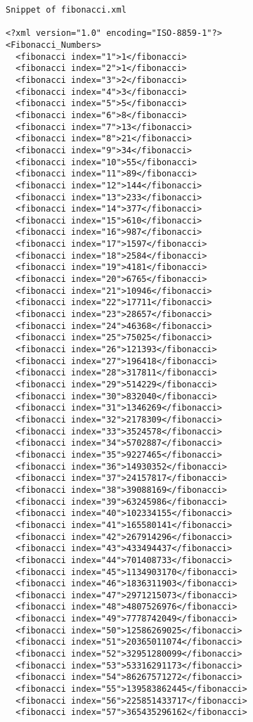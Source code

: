 \documentclass[11pt,english]{article}
\begin{document}
\begin{lstlisting}
Snippet of fibonacci.xml

<?xml version="1.0" encoding="ISO-8859-1"?>
<Fibonacci_Numbers>
  <fibonacci index="1">1</fibonacci>
  <fibonacci index="2">1</fibonacci>
  <fibonacci index="3">2</fibonacci>
  <fibonacci index="4">3</fibonacci>
  <fibonacci index="5">5</fibonacci>
  <fibonacci index="6">8</fibonacci>
  <fibonacci index="7">13</fibonacci>
  <fibonacci index="8">21</fibonacci>
  <fibonacci index="9">34</fibonacci>
  <fibonacci index="10">55</fibonacci>
  <fibonacci index="11">89</fibonacci>
  <fibonacci index="12">144</fibonacci>
  <fibonacci index="13">233</fibonacci>
  <fibonacci index="14">377</fibonacci>
  <fibonacci index="15">610</fibonacci>
  <fibonacci index="16">987</fibonacci>
  <fibonacci index="17">1597</fibonacci>
  <fibonacci index="18">2584</fibonacci>
  <fibonacci index="19">4181</fibonacci>
  <fibonacci index="20">6765</fibonacci>
  <fibonacci index="21">10946</fibonacci>
  <fibonacci index="22">17711</fibonacci>
  <fibonacci index="23">28657</fibonacci>
  <fibonacci index="24">46368</fibonacci>
  <fibonacci index="25">75025</fibonacci>
  <fibonacci index="26">121393</fibonacci>
  <fibonacci index="27">196418</fibonacci>
  <fibonacci index="28">317811</fibonacci>
  <fibonacci index="29">514229</fibonacci>
  <fibonacci index="30">832040</fibonacci>
  <fibonacci index="31">1346269</fibonacci>
  <fibonacci index="32">2178309</fibonacci>
  <fibonacci index="33">3524578</fibonacci>
  <fibonacci index="34">5702887</fibonacci>
  <fibonacci index="35">9227465</fibonacci>
  <fibonacci index="36">14930352</fibonacci>
  <fibonacci index="37">24157817</fibonacci>
  <fibonacci index="38">39088169</fibonacci>
  <fibonacci index="39">63245986</fibonacci>
  <fibonacci index="40">102334155</fibonacci>
  <fibonacci index="41">165580141</fibonacci>
  <fibonacci index="42">267914296</fibonacci>
  <fibonacci index="43">433494437</fibonacci>
  <fibonacci index="44">701408733</fibonacci>
  <fibonacci index="45">1134903170</fibonacci>
  <fibonacci index="46">1836311903</fibonacci>
  <fibonacci index="47">2971215073</fibonacci>
  <fibonacci index="48">4807526976</fibonacci>
  <fibonacci index="49">7778742049</fibonacci>
  <fibonacci index="50">12586269025</fibonacci>
  <fibonacci index="51">20365011074</fibonacci>
  <fibonacci index="52">32951280099</fibonacci>
  <fibonacci index="53">53316291173</fibonacci>
  <fibonacci index="54">86267571272</fibonacci>
  <fibonacci index="55">139583862445</fibonacci>
  <fibonacci index="56">225851433717</fibonacci>
  <fibonacci index="57">365435296162</fibonacci>

\end{lstlisting}
\end{document}
